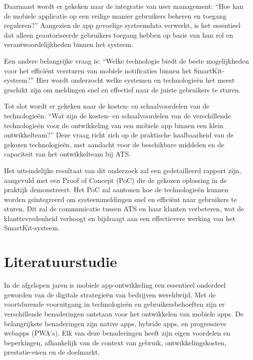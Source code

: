 Daarnaast wordt er gekeken naar de integratie van user management: “Hoe kan de mobiele applicatie op een veilige manier gebruikers beheren en toegang reguleren?” Aangezien de app gevoelige systeemdata verwerkt, is het essentieel dat alleen geautoriseerde gebruikers toegang hebben op basis van hun rol en verantwoordelijkheden binnen het systeem.

Een andere belangrijke vraag is: “Welke technologie biedt de beste mogelijkheden voor het efficiënt versturen van mobiele notificaties binnen het SmartKit-systeem?” Hier wordt onderzocht welke systemen en technologieën het meest geschikt zijn om meldingen snel en effectief naar de juiste gebruikers te sturen.

Tot slot wordt er gekeken naar de kosten- en schaalvoordelen van de technologieën: “Wat zijn de kosten- en schaalvoordelen van de verschillende technologieën voor de ontwikkeling van een mobiele app binnen een klein ontwikkelteam?” Deze vraag richt zich op de praktische haalbaarheid van de gekozen technologieën, met aandacht voor de beschikbare middelen en de capaciteit van het ontwikkelteam bij ATS.

Het uiteindelijke resultaat van dit onderzoek zal een gedetailleerd rapport zijn, aangevuld met een Proof of Concept (PoC) die de gekozen oplossing in de praktijk demonstreert. Het PoC zal aantonen hoe de technologieën kunnen worden geïntegreerd om systeemmeldingen snel en efficiënt naar gebruikers te sturen. Dit zal de communicatie tussen ATS en haar klanten verbeteren, wat de klanttevredenheid verhoogt en bijdraagt aan een effectievere werking van het SmartKit-systeem.


\section{Literatuurstudie}%

\noindent In de afgelopen jaren is mobiele app-ontwikkeling een essentieel onderdeel geworden van de digitale strategieën van bedrijven wereldwijd. Met de voortdurende vooruitgang in technologieën en gebruikersbehoeften zijn er verschillende benaderingen ontstaan voor het ontwikkelen van mobiele apps. De belangrijkste benaderingen zijn native apps, hybride apps, en progressieve webapps (PWA's). Elk van deze benaderingen heeft zijn eigen voordelen en beperkingen, afhankelijk van de context van gebruik, ontwikkelingskosten, prestatie-eisen en de doelmarkt.

